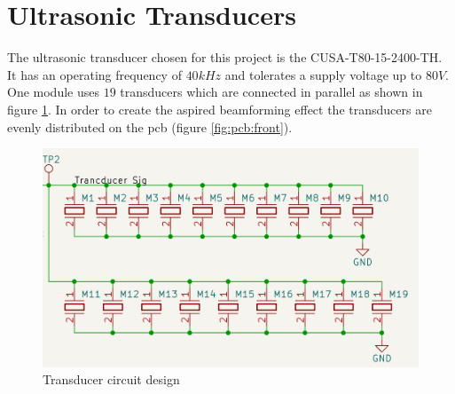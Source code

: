 \section{Ultrasonic Transducers}

The ultrasonic transducer chosen for this project is the CUSA-T80-15-2400-TH. It has an operating frequency of $40kHz$ and tolerates a supply voltage up to $80V$.\cite{cui_devices_cusa-t80-15-2400-th_2020}\newpage
\noindent One module uses $19$ transducers which are connected in parallel as shown in figure \ref{fig:pcb:transducer_circuit}. In order to create the aspired beamforming effect the transducers are evenly distributed on the pcb (figure \ref{fig:pcb:front}).
%
\begin{figure}
  \centering
  \includegraphics[height=\mediumheight]{src/assets/pictures/circuit/transducer_circuit.png}
  \caption{Transducer circuit design}\label{fig:pcb:transducer_circuit}
\end{figure}
